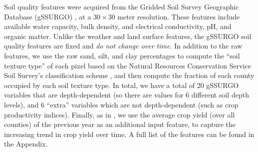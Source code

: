 


Soil quality features were acquired from the Gridded Soil Survey Geographic Database (gSSURGO) \cite{soil2019gridded}, at a $30 \times 30$ meter resolution. These features include available water capacity, bulk density, and electrical conductivity, pH, and organic matter.
Unlike the weather and land surface features, the gSSURGO soil quality features are fixed and \emph{do not change over time}. In addition to the raw features, we use the raw sand, silt, and clay percentages to compute the ``soil texture type'' of each pixel based on the Natural Resources Conservation Service Soil Survey's classification scheme \cite{soiltexture}, and then compute the fraction of each county occupied by each soil texture type. In total, we have a total of 20 gSSURGO variables that are depth-dependent (so there are values for 6 different soil depth levels), and 6 ``extra'' variables which are not depth-dependent (such as crop productivity indices). Finally, as in \cite{khaki2020cnn}, we use the average crop yield (over all counties) of the previous year as an additional input feature, to capture the increasing trend in crop yield over time. A full list of the features can be found in the Appendix.



